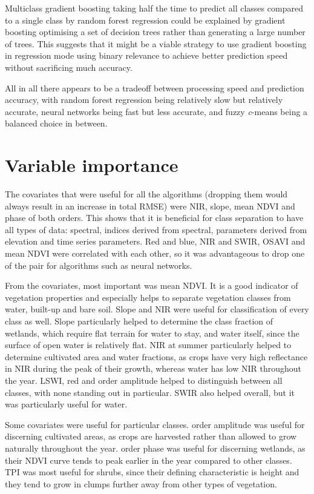 \documentclass[a4paper,10pt]{book}
\begin{document}
Multiclass gradient boosting taking half the time to predict all classes compared to a single class by random forest regression could be explained by gradient boosting optimising a set of decision trees rather than generating a large number of trees. This suggests that it might be a viable strategy to use gradient boosting in regression mode using binary relevance to achieve better prediction speed without sacrificing much accuracy.

All in all there appears to be a tradeoff between processing speed and prediction accuracy, with random forest regression being relatively slow but relatively accurate, neural networks being fast but less accurate, and fuzzy \textit{c}-means being a balanced choice in between.

\section{Variable importance}

The covariates that were useful for all the algorithms (dropping them would always result in an increase in total RMSE) were NIR, slope, mean NDVI and phase of both orders. This shows that it is beneficial for class separation to have all types of data: spectral, indices derived from spectral, parameters derived from elevation and time series parameters. Red and blue, NIR and SWIR, OSAVI and mean NDVI were correlated with each other, so it was advantageous to drop one of the pair for algorithms such as neural networks.

From the covariates, most important was mean NDVI. It is a good indicator of vegetation properties and especially helps to separate vegetation classes from water, built-up and bare soil. Slope and NIR were useful for classification of every class as well. Slope particularly helped to determine the class fraction of wetlands, which require flat terrain for water to stay, and water itself, since the surface of open water is relatively flat. NIR at summer particularly helped to determine cultivated area and water fractions, as crops have very high reflectance in NIR during the peak of their growth, whereas water has low NIR throughout the year. LSWI, red and  order amplitude helped to distinguish between all classes, with none standing out in particular. SWIR also helped overall, but it was particularly useful for water.

Some covariates were useful for particular classes.  order amplitude was useful for discerning cultivated areas, as crops are harvested rather than allowed to grow naturally throughout the year.  order phase was useful for discerning wetlands, as their NDVI curve tends to peak earlier in the year compared to other classes. TPI was most useful for shrubs, since their defining characteristic is height and they tend to grow in clumps further away from other types of vegetation.
\end{document}
